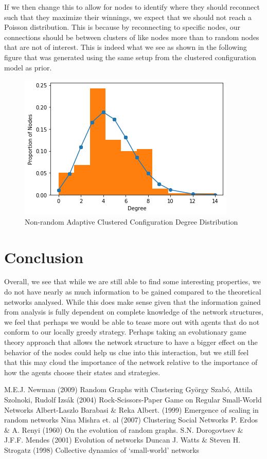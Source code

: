 \documentclass[letterpaper, 12 pt, conference]{ieeeconf}
\begin{document}
\newpage
If we then change this to allow for nodes to identify where they should reconnect such that they maximize their winnings, we expect that we should not reach a Poisson distribution. This is because by reconnecting to specific nodes, our connections should be between clusters of like nodes more than to random nodes that are not of interest. This is indeed what we see as shown in the following figure that was generated using the same setup from the clustered configuration model as prior. 
\begin{figure}[ht]
    \centering
    \includegraphics[width=\columnwidth]{degree_dist.png}
    \caption{Non-random Adaptive Clustered Configuration Degree Distribution}
    \label{fig:nrcc}
\end{figure}
\section*{Conclusion}
Overall, we see that while we are still able to find some interesting properties, we do not have nearly as much information to be gained compared to the theoretical networks analysed. While this does make sense given that the information gained from analysis is fully dependent on complete knowledge of the network structures, we feel that perhaps we would be able to tease more out with agents that do not conform to our locally greedy strategy. Perhaps taking an evolutionary game theory approach that allows the network structure to have a bigger effect on the behavior of the nodes could help us clue into this interaction, but we still feel that this may cloud the importance of the network relative to the importance of how the agents choose their states and strategies.
\addtolength{\textheight}{-9cm}  
\newpage
\begin{thebibliography}{99}
M.E.J. Newman (2009) Random Graphs with Clustering 
György Szabó, Attila Szolnoki, Rudolf Izsák (2004)
Rock-Scissors-Paper Game on Regular Small-World Networks
Albert-Laszlo Barabasi $\&$ Reka Albert. (1999) Emergence of scaling in random networks
Nina Mishra et. al (2007) Clustering Social Networks
P. Erdos $\&$ A. Renyi (1960) On the evolution of random graphs.
S.N. Dorogovtsev $\&$ J.F.F. Mendes (2001) Evolution of networks
Duncan J. Watts $\&$ Steven H. Strogatz (1998) Collective dynamics of `small-world' networks
\end{thebibliography}
\end{document}

